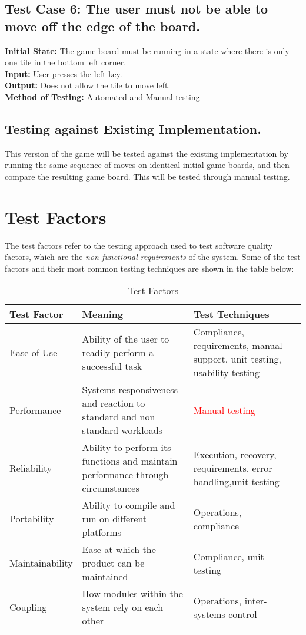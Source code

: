 \documentclass[12pt]{article}
\begin{document}
\subsection{Test Case 6: The user must not be able to move off the edge of the board.}

\textbf{Initial State:} The game board must be running in a state where there is only one tile in the bottom left corner.\\
\textbf{Input:} User presses the left key.\\
\textbf{Output:} Does not allow the tile to move left.\\
\textbf{Method of Testing:} Automated and Manual testing

\subsection{Testing against Existing Implementation.}
This version of the game will be tested against the existing implementation by running the same sequence of moves on identical initial game boards, and then compare the resulting game board. This will be tested through manual testing.

\section{Test Factors}
The test factors refer to the testing approach used to test software quality factors, which are the \emph{non-functional requirements} of the system. Some of the test factors and their most common testing techniques are shown in the table below:
\begin{table}[H]
	\centering
	\begin{tabular}{ | l |p{5cm}|p{5cm}| l | |}
		\hline
		Test Factor & Meaning & Test Techniques \\ \hline
		Ease of Use & Ability of the user to readily perform a successful task 		& Compliance, requirements, manual support, unit testing, usability 		testing \\ \hline
		Performance & Systems responsiveness and reaction to standard and non 		standard workloads & \textcolor{red}{Manual testing} \\\hline
		Reliability & Ability to perform its functions and maintain performance 		through circumstances & Execution, recovery, requirements, error 		handling,unit testing  \\ \hline
		Portability & Ability to compile and run on different platforms & 		Operations, compliance \\ \hline
		Maintainability & Ease at which the product can be maintained & 		Compliance, unit testing \\ \hline
		Coupling & How modules within the system rely on each other & 		Operations, inter-systems control \\\hline
	\end{tabular}
	\caption{Test Factors}
\end{table}
\end{document}
